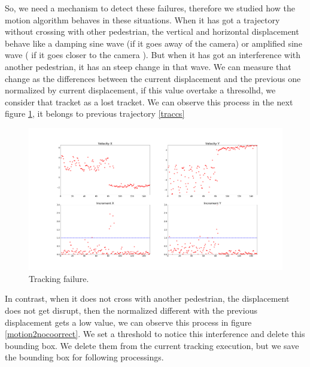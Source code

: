 So, we need a mechanism to detect these failures, therefore we studied how the motion algorithm behaves in these situations. When it has got a trajectory without crossing with other pedestrian, the vertical and horizontal displacement behave like a damping sine wave (if it goes away of the camera)  or amplified sine wave ( if it goes closer to the camera ). But when it has got an interference with another pedestrian, it has an steep change in that wave. We can measure that change as the differences between the current displacement and the previous one normalized by current displacement, if this value overtake a thresolhd, we consider that tracket as a lost tracket. We can observe this process in the next figure \ref{traccs23}, it belongs to previous trajectory \ref{traccs} 


\begin{figure}[H]
\centering         
\includegraphics[width=0.9\linewidth]{velocidadas/bad_threshold.png}
\caption{Tracking failure.} \label{traccs23}
\end{figure}


In contrast, when it does not cross with another pedestrian, the displacement does not get disrupt, then the normalized different with the previous displacement gets a low value, we can observe this process in figure \ref{motion2nocoorrect}. We set a threshold to notice this interference and delete this bounding box. We delete them from the current tracking execution, but we save the bounding box for following processings.

